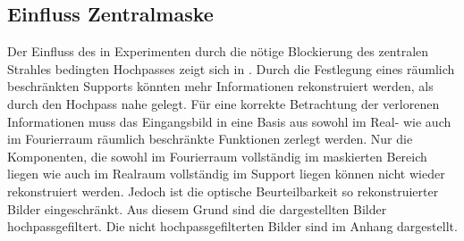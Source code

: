 \subsection{Einfluss Zentralmaske}
Der Einfluss des in Experimenten durch die nötige Blockierung des zentralen Strahles bedingten Hochpasses zeigt sich in . Durch die Festlegung eines räumlich beschränkten Supports könnten mehr Informationen rekonstruiert werden, als durch den Hochpass nahe gelegt. Für eine korrekte Betrachtung der verlorenen Informationen muss das Eingangsbild in eine Basis aus sowohl im Real- wie auch im Fourierraum räumlich beschränkte Funktionen zerlegt werden. Nur die Komponenten, die sowohl im Fourierraum vollständig im maskierten Bereich liegen wie auch im Realraum vollständig im Support liegen können nicht wieder rekonstruiert werden. Jedoch ist die optische Beurteilbarkeit so rekonstruierter Bilder eingeschränkt. Aus diesem Grund sind die dargestellten Bilder hochpassgefiltert. Die nicht hochpassgefilterten Bilder sind im Anhang dargestellt.
